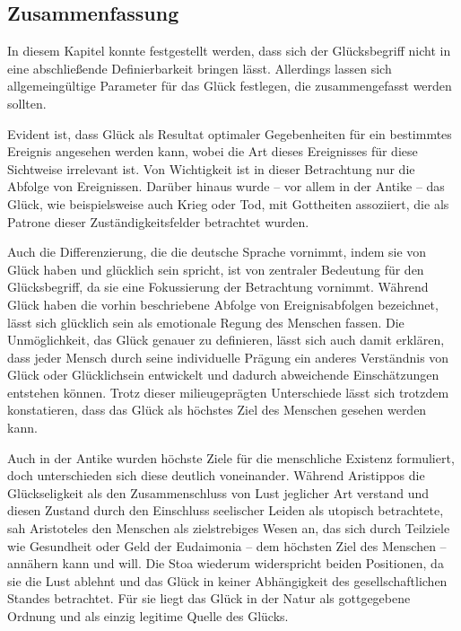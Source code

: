 \subsection{Zusammenfassung}

In diesem Kapitel konnte festgestellt werden, dass sich der Glücksbegriff nicht in eine abschließende Definierbarkeit bringen lässt. 
Allerdings lassen sich allgemeingültige Parameter für das Glück festlegen, die zusammengefasst werden sollten.

Evident ist, dass Glück als Resultat optimaler Gegebenheiten für ein bestimmtes Ereignis angesehen werden kann, wobei die Art dieses Ereignisses für diese Sichtweise irrelevant ist. 
Von Wichtigkeit ist in dieser Betrachtung nur die Abfolge von Ereignissen. 
Darüber hinaus wurde -- vor allem in der Antike -- das Glück, wie beispielsweise auch Krieg oder Tod, mit Gottheiten assoziiert, die als Patrone dieser Zuständigkeitsfelder betrachtet wurden. 

Auch die Differenzierung, die die deutsche Sprache vornimmt, indem sie von \glqq Glück haben\grqq{} und \glqq glücklich sein\grqq{} spricht, ist von zentraler Bedeutung für den Glücksbegriff, da sie eine Fokussierung der Betrachtung vornimmt. 
Während \glqq Glück haben\grqq{} die vorhin beschriebene Abfolge von Ereignisabfolgen bezeichnet, lässt sich  \glqq glücklich sein\grqq{} als emotionale Regung des Menschen fassen. 
Die Unmöglichkeit, das Glück genauer zu definieren, lässt sich auch damit erklären, dass jeder Mensch durch seine individuelle Prägung ein anderes Verständnis von Glück oder Glücklichsein entwickelt und dadurch abweichende Einschätzungen entstehen können. 
Trotz dieser milieugeprägten Unterschiede lässt sich trotzdem konstatieren, dass das Glück als höchstes Ziel des Menschen gesehen werden kann.

Auch in der Antike wurden höchste Ziele für die menschliche Existenz formuliert, doch unterschieden sich diese deutlich voneinander. 
Während Aristippos die Glückseligkeit als den Zusammenschluss von Lust jeglicher Art verstand und diesen Zustand durch den Einschluss seelischer Leiden als utopisch betrachtete, sah Aristoteles den Menschen als zielstrebiges Wesen an, das sich durch Teilziele wie Gesundheit oder Geld der Eudaimonia -- dem höchsten Ziel des Menschen -- annähern kann und will. 
Die Stoa wiederum widerspricht beiden Positionen, da sie die Lust ablehnt und das Glück in keiner Abhängigkeit des gesellschaftlichen Standes betrachtet. 
Für sie liegt das Glück in der Natur als gottgegebene Ordnung und als einzig legitime Quelle des Glücks.

